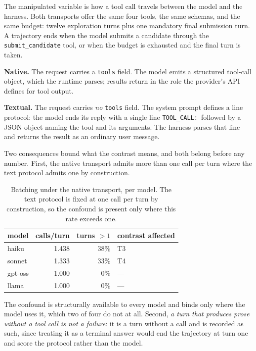 The manipulated variable is how a tool call travels between the model and the harness. Both
transports offer the same four tools, the same schemas, and the same budget: twelve exploration turns
plus one mandatory final submission turn. A trajectory ends when the model submits a candidate through
the \texttt{submit\_candidate} tool, or when the budget is exhausted and the final turn is taken.

\textbf{Native.} The request carries a \texttt{tools} field. The model emits a structured
tool-call object, which the runtime parses; results return in the role the provider's API
defines for tool output.

\textbf{Textual.} The request carries \emph{no} \texttt{tools} field. The system prompt
defines a line protocol: the model ends its reply with a single line
\texttt{TOOL\_CALL:}~followed by a JSON object naming the tool and its arguments. The
harness parses that line and returns the result as an ordinary user message.

Two consequences bound what the contrast means, and both belong before any number. First, the native
transport admits more than one call per turn where the text protocol admits one by construction.

\begin{table}[h]
\caption{Batching under the native transport, per model. The text protocol is fixed at one
call per turn by construction, so the confound is present only where this rate exceeds one.}
\label{tab:batching-rate}
\centering
\small
\begin{tabular}{lrrl}
\toprule
model & calls/turn & turns $>1$ & contrast affected \\
\midrule
haiku & 1.438 & 38\% & T3 \\
sonnet & 1.333 & 33\% & T4 \\
gpt-oss & 1.000 & 0\% & --- \\
llama & 1.000 & 0\% & --- \\
\bottomrule
\end{tabular}
\end{table}

The confound is structurally available to every model and binds only where the model uses it, which
two of four do not at all. Second, \emph{a turn that produces prose without a tool call is not a
failure}: it is a turn without a call and is recorded as such, since treating it as a terminal answer
would end the trajectory at turn one and score the protocol rather than the model.

